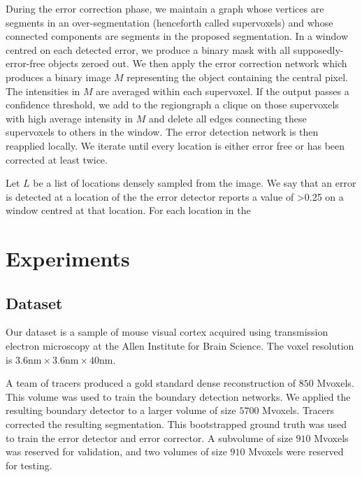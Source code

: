 \documentclass{article}
\begin{document}
During the error correction phase, we maintain a graph whose vertices are segments in an over-segmentation (henceforth called supervoxels) and whose connected components are segments in the proposed segmentation. In a window centred on each detected error, we produce a binary mask with all supposedly-error-free objects zeroed out. We then apply the error correction network which produces a binary image $M$ representing the object containing the central pixel. The intensities in $M$ are averaged within each supervoxel. If the output passes a confidence threshold, we add to the regiongraph a clique on those supervoxels with high average intensity in $M$ and delete all edges connecting these supervoxels to others in the window. The error detection network is then reapplied locally. We iterate until every location is either error free or has been corrected at least twice.



Let $L$ be a list of locations densely sampled from the image. We say that an error is detected at a location of the the error detector reports a value of >0.25 on a window centred at that location. For each location in the 

\section{Experiments}
\subsection{Dataset}


Our dataset is a sample of mouse visual cortex acquired using transmission electron microscopy at the Allen Institute for Brain Science. The voxel resolution is $3.6\text{nm} \times 3.6\text{nm} \times 40\text{nm}$.

A team of tracers produced a gold standard dense reconstruction of $850$ Mvoxels. This volume was used to train the boundary detection networks. We applied the resulting boundary detector to a larger volume of size $5700$ Mvoxels.  Tracers corrected the resulting segmentation. This bootstrapped ground truth was used to train the error detector and error corrector. A subvolume of size $910$ Mvoxels was reserved for validation, and two volumes of size $910$ Mvoxels were reserved for testing.
\end{document}
